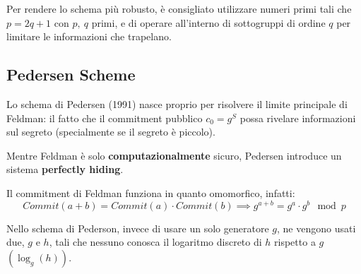 \documentclass[a4paper, 11pt]{article}
\begin{document}
    Per rendere lo schema più robusto, è consigliato utilizzare numeri primi tali che $p = 2q + 1$ con $p,\ q$ primi, e di operare all'interno di sottogruppi di ordine $q$ per limitare le informazioni che trapelano.

\newpage

\subsection{Pedersen Scheme}

Lo schema di Pedersen (1991) nasce proprio per risolvere il limite principale di Feldman: il fatto che il commitment pubblico $c_0=g^S$ possa rivelare informazioni sul segreto (specialmente se il segreto è piccolo).

Mentre Feldman è solo \textbf{computazionalmente} sicuro, Pedersen introduce un sistema \textbf{perfectly hiding}.

Il commitment di Feldman funziona in quanto omomorfico, infatti: 
\[
    Commit(a+b) = Commit(a) \cdot Commit(b) \implies g^{a + b} = g^a \cdot g^b \mod p
\]

Nello schema di Pederson, invece di usare un solo generatore $g$, ne vengono usati due, $g$ e $h$, tali che nessuno conosca il logaritmo discreto di $h$ rispetto a $g$ $(\log_g(h))$.
\end{document}
